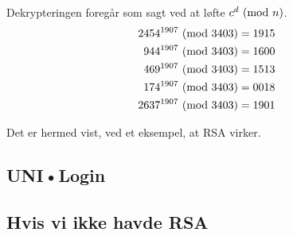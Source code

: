 Dekrypteringen foregår som sagt ved at løfte \(c^d \ (\mathrm{mod}\ n)\).
\begin{align*}
    2454^{1907} \ (\mathrm{mod}\ 3403) &= 1915\\
    944^{1907} \ (\mathrm{mod}\ 3403)  &= 1600\\
    469^{1907} \ (\mathrm{mod}\ 3403)  &= 1513\\
    174^{1907} \ (\mathrm{mod}\ 3403)  &= 0018\\
    2637^{1907} \ (\mathrm{mod}\ 3403) &= 1901\\
\end{align*}

Det er hermed vist, ved et eksempel, at RSA virker.



\subsection{UNI•Login}


\subsection{Hvis vi ikke havde RSA}
